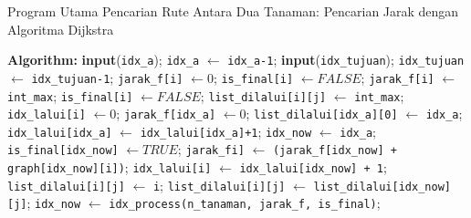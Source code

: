 \documentclass[conference]{IEEEtran}
\begin{document}
\begin{algorithm}
    \caption{Program Utama Pencarian Rute Antara Dua Tanaman: Pencarian Jarak dengan Algoritma Dijkstra}
    \begin{algorithmic}
    \State \textbf{Algorithm:}
    \State \textbf{input}(\texttt{idx\_a});
    \State \texttt{idx\_a} $\leftarrow$ \texttt{idx\_a-1};
    \State \textbf{input}(\texttt{idx\_tujuan});
    \State \texttt{idx\_tujuan} $\leftarrow$ \texttt{idx\_tujuan-1};
    \State \texttt{jarak\_f[i]} $\leftarrow 0$;
    \State \texttt{is\_final[i]} $\leftarrow FALSE$;
    \Else
    \State \texttt{jarak\_f[i]} $\leftarrow$ \texttt{int\_max};
    \State \texttt{is\_final[i]} $\leftarrow FALSE$;
    \EndIf
    \State \texttt{list\_dilalui[i][j]} $\leftarrow$ \texttt{int\_max};
    \EndFor
    \State \texttt{idx\_lalui[i]} $\leftarrow 0$;
    \EndFor
    \State \texttt{jarak\_f[idx\_a]} $\leftarrow 0$;
    \State \texttt{list\_dilalui[idx\_a][0]} $\leftarrow$ \texttt{idx\_a};
    \State \texttt{idx\_lalui[idx\_a]} $\leftarrow$ \texttt{idx\_lalui[idx\_a]+1};
    \State \texttt{idx\_now} $\leftarrow$ \texttt{idx\_a};
    \State \texttt{is\_final[idx\_now]} $\leftarrow TRUE$;
    \State \texttt{jarak\_fi]} $\leftarrow$ \texttt{(jarak\_f[idx\_now] + graph[idx\_now][i])};
    \State \texttt{idx\_lalui[i]} $\leftarrow$ \texttt{idx\_lalui[idx\_now] + 1};
    \EndIf
    \State \texttt{list\_dilalui[i][j]} $\leftarrow$ \texttt{i};
    \Else
    \State \texttt{list\_dilalui[i][j]} $\leftarrow$ \texttt{list\_dilalui[idx\_now][j]};
    \EndIf
    \EndFor
    \EndFor
    \State \texttt{idx\_now} $\leftarrow$ \texttt{idx\_process(n\_tanaman, jarak\_f, is\_final)};
    \EndWhile
    \end{algorithmic}
\end{algorithm}
\end{document}
